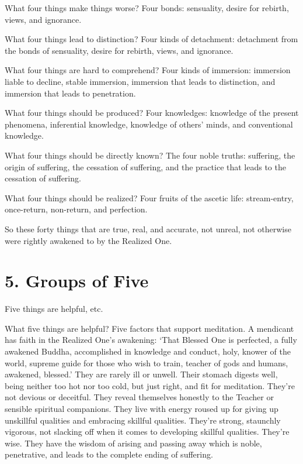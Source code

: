 \documentclass[12pt,openany]{book}%
\begin{document}
What four things make things worse? Four bonds: sensuality, desire for rebirth, views, and ignorance. 

What four things lead to distinction? Four kinds of detachment: detachment from the bonds of sensuality, desire for rebirth, views, and ignorance. 

What four things are hard to comprehend? Four kinds of immersion: immersion liable to decline, stable immersion, immersion that leads to distinction, and immersion that leads to penetration. 

What four things should be produced? Four knowledges: knowledge of the present phenomena, inferential knowledge, knowledge of others’ minds, and conventional knowledge. 

What four things should be directly known? The four noble truths: suffering, the origin of suffering, the cessation of suffering, and the practice that leads to the cessation of suffering. 

What four things should be realized? Four fruits of the ascetic life: stream-entry, once-return, non-return, and perfection. 

So these forty things that are true, real, and accurate, not unreal, not otherwise were rightly awakened to by the Realized One. 

\section*{5. Groups of Five }

Five things are helpful, etc. 

What five things are helpful? Five factors that support meditation. A mendicant has faith in the Realized One’s awakening: ‘That Blessed One is perfected, a fully awakened Buddha, accomplished in knowledge and conduct, holy, knower of the world, supreme guide for those who wish to train, teacher of gods and humans, awakened, blessed.’ They are rarely ill or unwell. Their stomach digests well, being neither too hot nor too cold, but just right, and fit for meditation. They’re not devious or deceitful. They reveal themselves honestly to the Teacher or sensible spiritual companions. They live with energy roused up for giving up unskillful qualities and embracing skillful qualities. They’re strong, staunchly vigorous, not slacking off when it comes to developing skillful qualities. They’re wise. They have the wisdom of arising and passing away which is noble, penetrative, and leads to the complete ending of suffering. 
\end{document}

